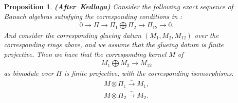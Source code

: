 \documentclass[12pt]{amsart}
\newtheorem{proposition}[theorem]{Proposition}
\theoremstyle{definition}
\numberwithin{equation}{section}
\begin{document}
\begin{proposition} \mbox{\bf{(After Kedlaya)}} \label{proposition5.11}
Consider the following exact sequence of Banach algebras satisfying the corresponding conditions in \cite[Definition 2.7.3 (a),(b)]{KL1}:
\begin{align}
0\rightarrow {\Pi}\rightarrow \Pi_1\bigoplus \Pi_2\rightarrow \Pi_{12}\rightarrow 0.	
\end{align}
And consider the corresponding glueing datum $(M_1,M_2,M_{12})$ over the corresponding rings above, and we assume that the glueing datum is finite projective. Then we have that the corresponding kernel $M$ of
\begin{align}
M_1\bigoplus M_2\rightarrow M_{12}	
\end{align}
as bimodule over $\Pi$ is finite projective, with the corresponding isomorphisms:
\begin{align}
M\otimes \Pi_1 \overset{\sim}{\rightarrow}	M_1,\\
M\otimes \Pi_2 \overset{\sim}{\rightarrow}	M_2.
\end{align}

\end{proposition}
\end{document}
